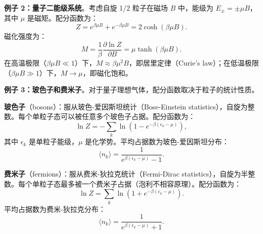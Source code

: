 \begin{example}[量子二能级系统]
\textbf{例子 2：量子二能级系统}。考虑自旋 1/2 粒子在磁场 $B$ 中，能级为 $E_\pm = \pm \mu B$，其中 $\mu$ 是磁矩。配分函数为：
\begin{equation}
    Z = e^{\beta \mu B} + e^{-\beta \mu B} = 2\cosh(\beta \mu B).
\end{equation}
磁化强度为：
\begin{equation}
    M = \frac{1}{\beta} \frac{\partial \ln Z}{\partial B} = \mu \tanh(\beta \mu B).
\end{equation}
在高温极限（$\beta \mu B \ll 1$）下，$M \approx \beta \mu^2 B$，即居里定律（Curie's law）；在低温极限（$\beta \mu B \gg 1$）下，$M \to \mu$，即磁化饱和。
\end{example}

\begin{example}[玻色子和费米子]
\textbf{例子 3：玻色子和费米子}。对于量子理想气体，配分函数取决于粒子的统计性质。

\textbf{玻色子}（bosons）：服从玻色-爱因斯坦统计（Bose-Einstein statistics），自旋为整数。每个单粒子态可以被任意多个玻色子占据。配分函数为：
\begin{equation}
    \ln Z = -\sum_k \ln(1 - e^{-\beta(\epsilon_k - \mu)}),
\end{equation}
其中 $\epsilon_k$ 是单粒子能级，$\mu$ 是化学势。平均占据数为玻色-爱因斯坦分布：
\begin{equation}
    \langle n_k \rangle = \frac{1}{e^{\beta(\epsilon_k - \mu)} - 1}.
\end{equation}

\textbf{费米子}（fermions）：服从费米-狄拉克统计（Fermi-Dirac statistics），自旋为半整数。每个单粒子态最多被一个费米子占据（泡利不相容原理）。配分函数为：
\begin{equation}
    \ln Z = \sum_k \ln(1 + e^{-\beta(\epsilon_k - \mu)}).
\end{equation}
平均占据数为费米-狄拉克分布：
\begin{equation}
    \langle n_k \rangle = \frac{1}{e^{\beta(\epsilon_k - \mu)} + 1}.
\end{equation}
\end{example}

